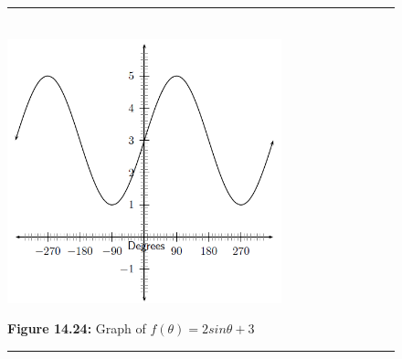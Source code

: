 	\begin{figure}[H] %
    \begin{center}
    \rule[.1in]{\figurerulewidth}{.005in} \\
        \label{m39414*uid33!!!underscore!!!media}\label{m39414*uid33!!!underscore!!!printimage}\includegraphics[width=300px]{col11306.imgs/m39414_trigrep.png} %
      \vspace{2pt}
    \vspace{\rubberspace}\par \begin{cnxcaption}
	  \small \textbf{Figure 14.24: }Graph of $f\left(\theta \right)=2sin\theta +3$
	\end{cnxcaption}
    \vspace{.1in}
    \rule[.1in]{\figurerulewidth}{.005in} \\
    \end{center}
 \end{figure}       
\label{m39414*secfhsst!!!underscore!!!id2083}
            \nopagebreak
